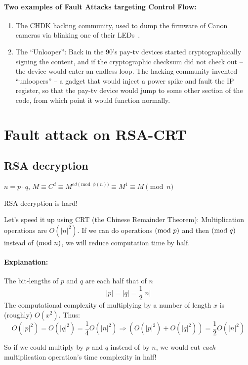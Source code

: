 \paragraph{Two examples of Fault Attacks targeting Control Flow:}
\begin{enumerate}
	\item The CHDK hacking community, used to dump the firmware of Canon
	cameras via blinking one of their LEDs~\cite{chdk, canon}.

	\item The ``Unlooper'': Back in the 90's pay-tv devices started
	cryptographically signing the content, and if the cryptographic checksum did
	not check out -- the device would enter an endless loop. The hacking
	community invented ``unloopers'' -- a gadget that would inject a power spike
	and fault the IP register, so that the pay-tv device would jump to some
	other section of the code, from which point it would function normally.
\end{enumerate}

\section{Fault attack on RSA-CRT}\label{sec:fault_attack_on_rsa_crt}

\subsection{RSA decryption}\label{subsec:rsa_decryption}
\(n = p\cdot q\), \(M \equiv C^d  \equiv M^{ed \pmod{\phi(n)}} \equiv M^1 \equiv M \pmod{n}\)

RSA decryption is hard!

Let's speed it up using CRT (the Chinese Remainder Theorem): Multiplication
operations are \(O(|n|^2)\). If we can do operations$\ (\mathrm{mod}\ p)$ and then$\ (\mathrm{mod}\ q)$ instead of$\ (\mathrm{mod}\ n)$, we will reduce computation time by half.

\paragraph{Explanation:}

The bit-lengths of \(p\) and \(q\) are each half that of \(n\)
\[|p|=|q|=\frac{1}{2}|n|\] The computational complexity of multiplying by a
number of length \(x\) is (roughly) \(O(x^2)\). Thus:
\[
O(|p|^2) = O(|q|^2) = \frac{1}{4}O(|n|^2) \Rightarrow (O(|p|^2) + O(|q|^2)) = \frac{1}{2}O(|n|^2)
\]

So if we could multiply by \(p\) and \(q\) instead of by \(n\), we would cut
\emph{each} multiplication operation's time complexity in half!

